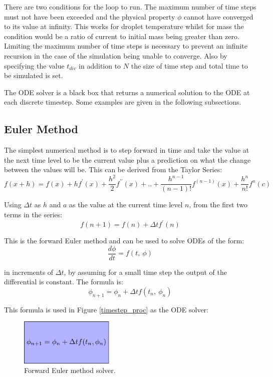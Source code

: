 \documentclass[../Interim_Report_Master]{subfiles}
\begin{document}
There are two conditions for the loop to run. The maximum number of time steps must not have been exceeded and the physical property $\phi$ cannot have converged to its value at infinity. This works for droplet temperature whilst for mass the condition would be a ratio of current to initial mass being greater than zero. Limiting the maximum number of time steps is necessary to prevent an infinite recursion in the case of the simulation being unable to converge. Also by specifying the value $t_{div}$ in addition to $N$ the size of time step and total time to be simulated is set.

The ODE solver is a black box that returns a numerical solution to the ODE at each discrete timestep. Some examples are given in the following subsections.

\subsection{Euler Method}
The simplest numerical method is to step forward in time and take the value at the next time level to be the current value plus a prediction on what the change between the values will be. This can be derived from the Taylor Series:
\begin{equation}
f(x+h) = f(x)+hf^\prime(x)+\frac{h^2}{2}f^{\prime\prime}(x)+..+\frac{h^{n-1}}{(n-1)!}f^{(n-1)}(x)+\frac{h^n}{n!}f^n(c)
\end{equation}

Using $\Delta t$ as $h$ and $a$ as the value at the current time level $n$, from the first two terms in the series:
\begin{equation}
f(n+1) = f(n)+\Delta tf^\prime(n)
\end{equation}

This is the forward Euler method and can be used to solve ODEs of the form:
\begin{equation}
\frac{d\phi}{dt} = f(t,~\phi)
\end{equation}

in increments of \(\Delta t\), by assuming for a small time step the output of the differential is constant. The formula is:
\begin{equation}
\phi_{n+1} = \phi_n + \Delta tf(t_n,~\phi_n)
\end{equation}

This formula is used in Figure \ref{timestep_proc} as the ODE solver:
\begin{figure}
	\centering
	\includegraphics[width=0.4\textwidth]{./Diagrams/Forward_Euler_Method_Flowchart/Forward_Euler_Method_Flowchart.pdf}
	\caption{Forward Euler method solver.}
	\label{forward_euler}
\end{figure}
\end{document}
